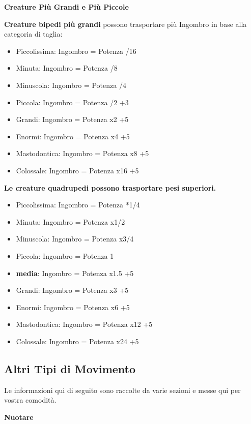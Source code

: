 \documentclass[a4paper,11pt,twoside,openany]{book}
\begin{document}
{\textbf{Creature Più Grandi e Più Piccole}

\textbf{Creature bipedi più grandi} possono trasportare più Ingombro in base alla categoria di taglia:

\begin{itemize}
	\item Piccolissima: Ingombro = Potenza /16
	\item Minuta: Ingombro = Potenza /8
	\item Minuscola: Ingombro = Potenza /4
	\item Piccola: Ingombro = Potenza /2 +3
	\item Grandi: Ingombro = Potenza x2 +5
	\item Enormi: Ingombro = Potenza x4 +5 
	\item Mastodontica: Ingombro = Potenza x8 +5
	\item Colossale: Ingombro = Potenza x16 +5
\end{itemize}

\bigskip


\textbf{Le creature quadrupedi possono trasportare pesi superiori. }


\begin{itemize}
	\item Piccolissima: Ingombro = Potenza *1/4
	\item Minuta: Ingombro = Potenza x1/2
	\item Minuscola: Ingombro = Potenza x3/4
	\item Piccola: Ingombro = Potenza 1
	\item \textbf{media}: Ingombro = Potenza x1.5 +5
	\item Grandi: Ingombro = Potenza x3 +5
	\item Enormi: Ingombro = Potenza x6 +5
	\item Mastodontica: Ingombro = Potenza x12 +5
	\item Colossale: Ingombro = Potenza x24 +5
\end{itemize}

\subsection{Altri Tipi di Movimento}

\label{altri-tipi-di-movimento}

Le informazioni qui di seguito sono raccolte da varie sezioni e messe
qui per vostra comodità.

\textbf{Nuotare}

}
\end{document}
